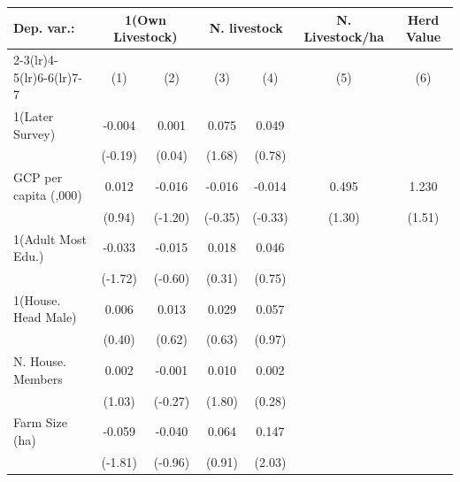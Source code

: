 \begin{tabular}{l*{6}{c}}
\toprule
Dep. var.: & \multicolumn{2}{c}{1(Own Livestock)} & \multicolumn{2}{c}{N. livestock} & N. Livestock/ha & Herd Value \\
\cmidrule(lr){2-3}\cmidrule(lr){4-5}\cmidrule(lr){6-6}\cmidrule(lr){7-7}
                &\multicolumn{1}{c}{(1)}         &\multicolumn{1}{c}{(2)}         &\multicolumn{1}{c}{(3)}         &\multicolumn{1}{c}{(4)}         &\multicolumn{1}{c}{(5)}         &\multicolumn{1}{c}{(6)}         \\
\midrule
1(Later Survey) &   -0.004         &    0.001         &    0.075\sym{*}  &    0.049         &                  &                  \\
                &  (-0.19)         &   (0.04)         &   (1.68)         &   (0.78)         &                  &                  \\
GCP per capita (\textdollar 1,000)&    0.012         &   -0.016         &   -0.016         &   -0.014         &    0.495         &    1.230         \\
                &   (0.94)         &  (-1.20)         &  (-0.35)         &  (-0.33)         &   (1.30)         &   (1.51)         \\
1(Adult Most Edu.)&   -0.033\sym{*}  &   -0.015         &    0.018         &    0.046         &                  &                  \\
                &  (-1.72)         &  (-0.60)         &   (0.31)         &   (0.75)         &                  &                  \\
1(House. Head Male)&    0.006         &    0.013         &    0.029         &    0.057         &                  &                  \\
                &   (0.40)         &   (0.62)         &   (0.63)         &   (0.97)         &                  &                  \\
N. House. Members&    0.002         &   -0.001         &    0.010\sym{*}  &    0.002         &                  &                  \\
                &   (1.03)         &  (-0.27)         &   (1.80)         &   (0.28)         &                  &                  \\
Farm Size (ha)  &   -0.059\sym{*}  &   -0.040         &    0.064         &    0.147\sym{**} &                  &                  \\
                &  (-1.81)         &  (-0.96)         &   (0.91)         &   (2.03)         &                  &                  \\

\end{tabular}
